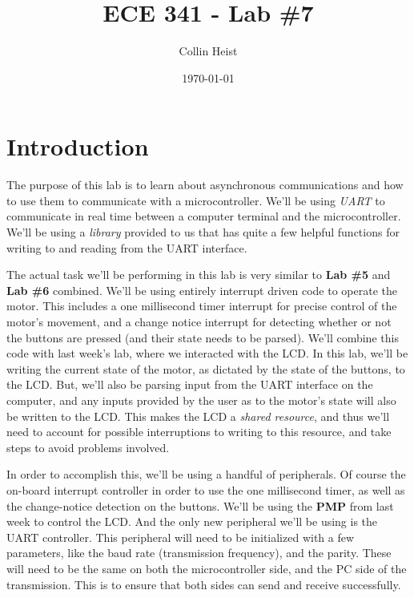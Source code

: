 \documentclass[a4paper, 12pt]{article}
\begin{document}
\title{ECE 341 - Lab \#7}
\author{Collin Heist}
\date{\today}
\maketitle
{}
\tableofcontents
\lstlistoflistings
\newpage
{}

\section{Introduction}
The purpose of this lab is to learn about asynchronous communications and how to use them to communicate with a microcontroller. We'll be using \textit{UART} to communicate in real time between a computer terminal and the microcontroller. We'll be using a \textit{library} provided to us that has quite a few helpful functions for writing to and reading from the UART interface.

The actual task we'll be performing in this lab is very similar to \textbf{Lab \#5} and \textbf{Lab \#6} combined. We'll be using entirely interrupt driven code to operate the motor. This includes a one millisecond timer interrupt for precise control of the motor's movement, and a change notice interrupt for detecting whether or not the buttons are pressed (and their state needs to be parsed). We'll combine this code with last week's lab, where we interacted with the LCD. In this lab, we'll be writing the current state of the motor, as dictated by the state of the buttons, to the LCD. But, we'll also be parsing input from the UART interface on the computer, and any inputs provided by the user as to the motor's state will also be written to the LCD. This makes the LCD a \textit{shared resource}, and thus we'll need to account for possible interruptions to writing to this resource, and take steps to avoid problems involved.

In order to accomplish this, we'll be using a handful of peripherals. Of course the on-board interrupt controller in order to use the one millisecond timer, as well as the change-notice detection on the buttons. We'll be using the \textbf{PMP} from last week to control the LCD. And the only new peripheral we'll be using is the UART controller. This peripheral will need to be initialized with a few parameters, like the baud rate (transmission frequency), and the parity. These will need to be the same on both the microcontroller side, and the PC side of the transmission. This is to ensure that both sides can send and receive successfully. 
\end{document}
